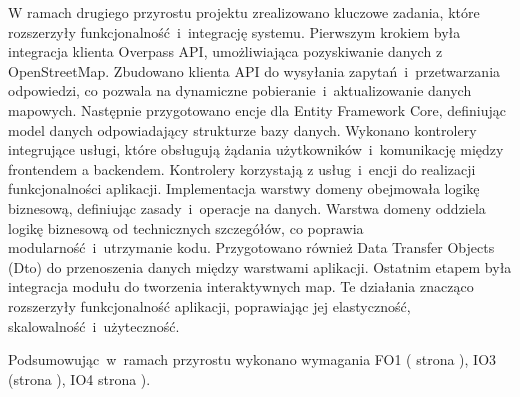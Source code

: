     W ramach drugiego przyrostu projektu zrealizowano kluczowe zadania, które rozszerzyły funkcjonalność~i~integrację systemu. \newline
    \indent Pierwszym krokiem była integracja klienta Overpass API, umożliwiająca pozyskiwanie danych z OpenStreetMap. Zbudowano klienta API do wysyłania zapytań~i~przetwarzania odpowiedzi, co pozwala na dynamiczne pobieranie~i~aktualizowanie danych mapowych.\newline
    \indent Następnie przygotowano encje dla Entity Framework Core, definiując model danych odpowiadający strukturze bazy danych.
    Wykonano kontrolery integrujące usługi, które obsługują żądania użytkowników~i~komunikację między frontendem a backendem. Kontrolery korzystają z usług~i~encji do realizacji funkcjonalności aplikacji.\newline
    \indent Implementacja warstwy domeny obejmowała logikę biznesową, definiując zasady~i~operacje na danych. Warstwa domeny oddziela logikę biznesową od technicznych szczegółów, co poprawia modularność~i~utrzymanie kodu.\newline
    \indent Przygotowano również Data Transfer Objects (Dto) do przenoszenia danych między warstwami aplikacji.    \newline
    \indent Ostatnim etapem była integracja modułu   do tworzenia interaktywnych map.\newline
    Te działania znacząco rozszerzyły funkcjonalność aplikacji, poprawiając jej elastyczność, skalowalność~i~użyteczność.\newline

    Podsumowując~w~ramach przyrostu wykonano wymagania FO1 ( strona \pageref{tab:requirements:func1}), IO3 (strona \pageref{tab:requirements:env3}), IO4 strona \pageref{tab:requirements:env4}).

